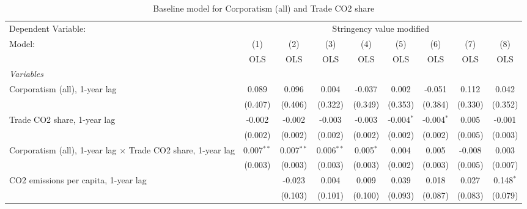 
\begin{table}[htbp]
   \caption{Baseline model for Corporatism (all) and Trade CO2 share}
   \centering
   \begin{tabular}{lcccccccc}
      \toprule
      Dependent Variable: & \multicolumn{8}{c}{Stringency value modified}\\
      Model:                                                              & (1)          & (2)          & (3)          & (4)         & (5)          & (6)          & (7)         & (8)\\  
                                                                          &  OLS         & OLS          & OLS          & OLS         & OLS          & OLS          & OLS         & OLS\\  
      \midrule
      \emph{Variables}\\
      Corporatism (all), 1-year lag                                       & 0.089        & 0.096        & 0.004        & -0.037      & 0.002        & -0.051       & 0.112       & 0.042\\   
                                                                          & (0.407)      & (0.406)      & (0.322)      & (0.349)     & (0.353)      & (0.384)      & (0.330)     & (0.352)\\   
      Trade CO2 share, 1-year lag                                         & -0.002       & -0.002       & -0.003       & -0.003      & -0.004$^{*}$ & -0.004$^{*}$ & 0.005       & -0.001\\   
                                                                          & (0.002)      & (0.002)      & (0.002)      & (0.002)     & (0.002)      & (0.002)      & (0.005)     & (0.003)\\   
      Corporatism (all), 1-year lag $\times$ Trade CO2 share, 1-year lag  & 0.007$^{**}$ & 0.007$^{**}$ & 0.006$^{**}$ & 0.005$^{*}$ & 0.004        & 0.005        & -0.008      & 0.003\\   
                                                                          & (0.003)      & (0.003)      & (0.003)      & (0.003)     & (0.002)      & (0.003)      & (0.005)     & (0.007)\\   
      CO2 emissions per capita, 1-year lag                                &              & -0.023       & 0.004        & 0.009       & 0.039        & 0.018        & 0.027       & 0.148$^{*}$\\   
                                                                          &              & (0.103)      & (0.101)      & (0.100)     & (0.093)      & (0.087)      & (0.083)     & (0.079)\\   

\end{tabular}
\end{table}
